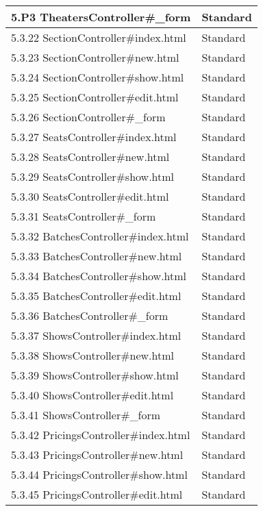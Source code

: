 \documentclass[a4paper, twoside, 11pt, titlepage]{article}
\begin{document}
\begin {table} [ht]
\begin{tabular} {  p{3.5cm} p{9.6cm} }
			\hline
			 5.P3 TheatersController\#\_form  &  Standard   \\
			\hline
			 5.3.22 SectionController\#index.html  &  Standard   \\
			\hline
			 5.3.23 SectionController\#new.html  &  Standard   \\
			\hline
			 5.3.24 SectionController\#show.html  &  Standard   \\
			\hline
			 5.3.25 SectionController\#edit.html  &  Standard   \\
			\hline
			 5.3.26 SectionController\#\_form  &  Standard   \\
			\hline
			 5.3.27 SeatsController\#index.html  &  Standard   \\
			\hline
			 5.3.28 SeatsController\#new.html  &  Standard   \\
			\hline
			 5.3.29 SeatsController\#show.html  &  Standard   \\
			\hline
			 5.3.30 SeatsController\#edit.html  &  Standard   \\
			\hline
			 5.3.31 SeatsController\#\_form  &  Standard   \\
			\hline
			 5.3.32 BatchesController\#index.html  &  Standard   \\
			\hline
			 5.3.33 BatchesController\#new.html  &  Standard   \\
			\hline
			 5.3.34 BatchesController\#show.html  &  Standard   \\
			\hline
			 5.3.35 BatchesController\#edit.html  &  Standard   \\
			\hline
			 5.3.36 BatchesController\#\_form  &  Standard   \\
			\hline
			 5.3.37 ShowsController\#index.html  &  Standard   \\
			\hline
			 5.3.38 ShowsController\#new.html  &  Standard   \\
			\hline
			 5.3.39 ShowsController\#show.html  &  Standard   \\
			\hline
			 5.3.40 ShowsController\#edit.html  &  Standard   \\
			\hline
			 5.3.41 ShowsController\#\_form  &  Standard   \\
			\hline
			 5.3.42 PricingsController\#index.html  &  Standard   \\
			\hline
			 5.3.43 PricingsController\#new.html  &  Standard   \\
			\hline
			 5.3.44 PricingsController\#show.html  &  Standard   \\
			\hline
			 5.3.45 PricingsController\#edit.html  &  Standard   \\

\end{tabular}
\end{table}
\end{document}
